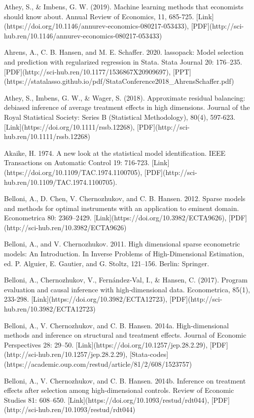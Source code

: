 {Athey, S., \& Imbens, G. W. (2019). Machine learning methods that economists should know about. Annual Review of Economics, 11, 685-725. [Link](https://doi.org/10.1146/annurev-economics-080217-053433), [PDF](http://sci-hub.ren/10.1146/annurev-economics-080217-053433)

Ahrens, A., C. B. Hansen, and M. E. Schaffer. 2020. lassopack: Model selection and prediction with regularized regression in Stata. Stata Journal 20: 176–235. [PDF](http://sci-hub.ren/10.1177/1536867X20909697), [PPT](https://statalasso.github.io/pdf/StataConference2018_AhrensSchaffer.pdf)

Athey, S., Imbens, G. W., \& Wager, S. (2018). Approximate residual balancing: debiased inference of average treatment effects in high dimensions. Journal of the Royal Statistical Society: Series B (Statistical Methodology), 80(4), 597-623. [Link](https://doi.org/10.1111/rssb.12268), [PDF](http://sci-hub.ren/10.1111/rssb.12268)         

Akaike, H. 1974. A new look at the statistical model identification.  IEEE Transactions on Automatic Control 19: 716-723. [Link](https://doi.org/10.1109/TAC.1974.1100705), [PDF](http://sci-hub.ren/10.1109/TAC.1974.1100705).

Belloni, A., D. Chen, V. Chernozhukov, and C. B. Hansen. 2012. Sparse models and methods for optimal instruments
with an application to eminent domain. Econometrica 80: 2369–2429. [Link](https://doi.org/10.3982/ECTA9626), [PDF](http://sci-hub.ren/10.3982/ECTA9626) %

Belloni, A., and V. Chernozhukov. 2011. High dimensional sparse econometric models: An Introduction. In Inverse
Problems of High-Dimensional Estimation, ed. P. Alguier, E. Gautier, and G. Stoltz, 121–156. Berlin: Springer.


Belloni, A., Chernozhukov, V., Fernández‐Val, I., \& Hansen, C. (2017). Program evaluation and causal inference with high‐dimensional data. Econometrica, 85(1), 233-298. [Link](https://doi.org/10.3982/ECTA12723), [PDF](http://sci-hub.ren/10.3982/ECTA12723)

Belloni, A., V. Chernozhukov, and C. B. Hansen. 2014a. High-dimensional methods and inference on structural and
treatment effects. Journal of Economic Perspectives 28: 29–50. [Link](https://doi.org/10.1257/jep.28.2.29), [PDF](http://sci-hub.ren/10.1257/jep.28.2.29), [Stata-codes](https://academic.oup.com/restud/article/81/2/608/1523757)

Belloni, A., V. Chernozhukov, and C. B. Hansen. 2014b. Inference on treatment effects after selection among high-dimensional controls. Review of Economic Studies 81: 608–650. [Link](https://doi.org/10.1093/restud/rdt044), [PDF](http://sci-hub.ren/10.1093/restud/rdt044)

}
